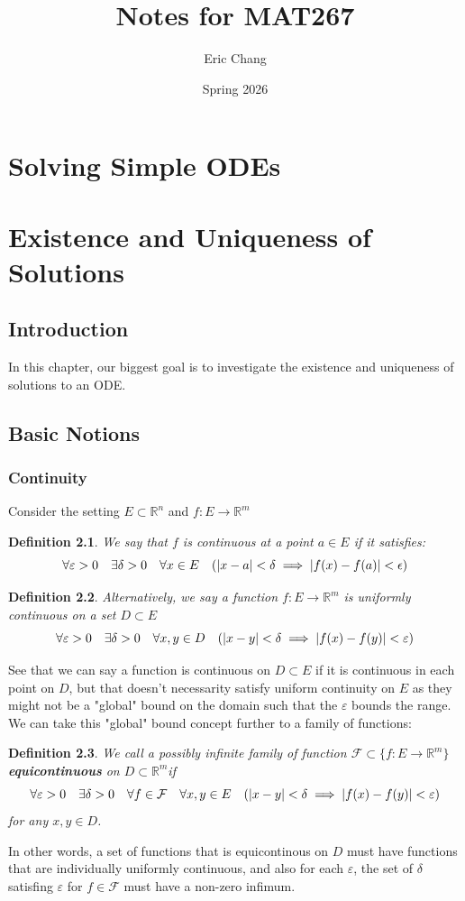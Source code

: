 \documentclass[a4paper, 12pt]{book}
\title{Notes for MAT267}
\author{Eric Chang}
\date{Spring 2026}
\newtheorem{definition}{Definition}[chapter]
\begin{document}
\maketitle
\tableofcontents
\chapter{Solving Simple ODEs}
\chapter{Existence and Uniqueness of Solutions}
\section{Introduction}
In this chapter, our biggest goal is to investigate the existence and uniqueness of solutions to an ODE.
\section{Basic Notions}
\subsection{Continuity}
Consider the setting \( E \subset \mathbb{R}^n \) and \( f: E \to \mathbb{R}^m \)
\begin{definition}
	We say that \( f \) is continuous at a point \( a \in E \) if it satisfies: \[
		\forall \varepsilon>0\quad \exists \delta>0 \quad \forall x \in E \quad (\abs{x-a} < \delta \implies \abs{f(x)-f(a)}< \epsilon)	    \]
\end{definition}
\begin{definition}
	Alternatively, we say a function \( f:E \to \mathbb{R}^m \) is uniformly continuous on a set \( D \subset E \) \[
		\forall \varepsilon>0 \quad \exists \delta > 0 \quad \forall x,y \in D\quad(\abs{x-y}<\delta\implies \abs{f(x)-f(y)}<\varepsilon)
	\]
\end{definition}
See that we can say a function is continuous on \( D \subset E \) if it is continuous in each point on \( D \), but that doesn't necessarity satisfy uniform continuity on \( E \) as they might not be a "global" bound on the domain such that the \( \varepsilon \) bounds the range.\\

We can take this "global" bound concept further to a family of functions:
\begin{definition}
	We call a possibly infinite family of function \( \mathcal{F}\subset \{f:E\to \mathbb{R}^m \}\) \textbf{equicontinuous} on \( D \subset \mathbb{R}^m \)if \[
		\forall \varepsilon>0 \quad \exists \delta>0\quad \forall f \in \mathcal{F}\quad \forall x,y\in E \quad (\abs{x-y} <\delta \implies \abs{f(x)-f(y)} < \varepsilon)
	\] for any \( x,y \in D \).
\end{definition}
In other words, a set of functions that is equicontinous on \( D \) must have functions that are individually uniformly continuous, and also for each \( \varepsilon \), the set of \( \delta \) satisfing \( \varepsilon \) for \( f\in \mathcal{F} \) must have a non-zero infimum.
\end{document}
